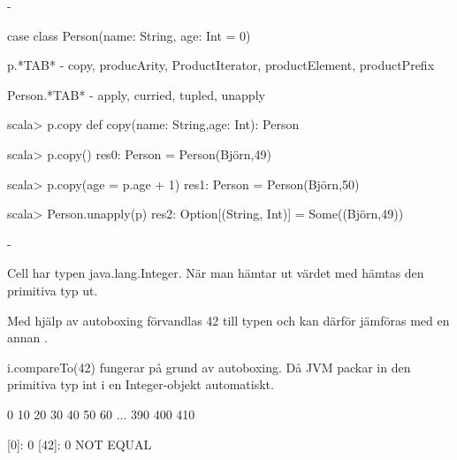 

\ExerciseSolution{\ExeWeekELEVEN}


\Task     %

\Subtask {}

\Subtask {}


\Task     %

\Subtask  {}

\Subtask  -

\Subtask  \begin{Code}
case class Person(name: String, age: Int = 0)
\end{Code}

\Subtask p.*TAB* - copy, producArity, ProductIterator, productElement, productPrefix

Person.*TAB* - apply, curried, tupled, unapply

\begin{REPLnonum}
scala> p.copy
   def copy(name: String,age: Int): Person

scala> p.copy()
res0: Person = Person(Björn,49)

scala> p.copy(age = p.age + 1)
res1: Person = Person(Björn,50)

scala> Person.unapply(p)
res2: Option[(String, Int)] = Some((Björn,49))
\end{REPLnonum}


\Task     %

\Subtask  -

\Subtask  Cell har typen java.lang.Integer. När man hämtar ut värdet med  hämtas den primitiva typ  ut.

\Subtask  Med hjälp av autoboxing förvandlas 42 till typen  och kan därför jämföras med en annan .

\Subtask  i.compareTo(42) fungerar på grund av autoboxing. Då JVM packar in den primitiva typ int i en Integer-objekt automatiskt.

\Subtask
\begin{REPLnonum}
0 10 20 30 40 50 60 ... 390 400 410

[0]: 0
[42]: 0
NOT EQUAL
\end{REPLnonum}

